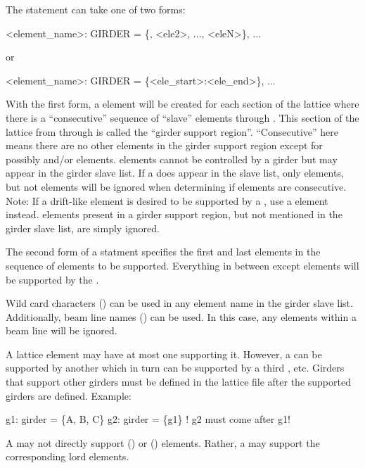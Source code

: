 The  statement can take one of two forms:
\begin{example}
  <element_name>: GIRDER = \{<ele1>, <ele2>, ..., <eleN>\}, ... 
\end{example}
or
\begin{example}
  <element_name>: GIRDER = \{<ele_start>:<ele_end>\}, ... 
\end{example}

With the first form, a  element will be created for each section of the lattice where there is a
``consecutive'' sequence of ``slave'' elements  through .  This
section of the lattice from  through  is called the ``girder support
region''.  ``Consecutive'' here means there are no other elements in the girder support
region except for possibly  and/or  elements.   elements
cannot be controlled by a girder but may appear in the girder slave list. If a 
does appear in the slave list, only  elements, but not  elements will
be ignored when determining if elements are consecutive. Note: If a drift-like element is
desired to be supported by a , use a  element instead. 
elements present in a girder support region, but not mentioned in the girder slave list,
are simply ignored.

The second form of a  statment specifies the first and last elements in the 
sequence of elements to be supported. Everything in between except  elements will
be supported by the .

Wild card characters () can be used in any element
name in the girder slave list. Additionally, beam line names
() can be used. In this case, any  elements
within a beam line will be ignored.

A lattice element may have at most one  supporting
it. However, a  can be supported by another 
which in turn can be supported by a third , etc. Girders
that support other girders must be defined in the lattice file after
the supported girders are defined. Example:
\begin{example}
  g1: girder = \{A, B, C\}
  g2: girder = \{g1\}      ! g2 must come after g1!
\end{example}

A  may not directly support 
() or  ()
elements. Rather, a  may support the corresponding lord
elements.

